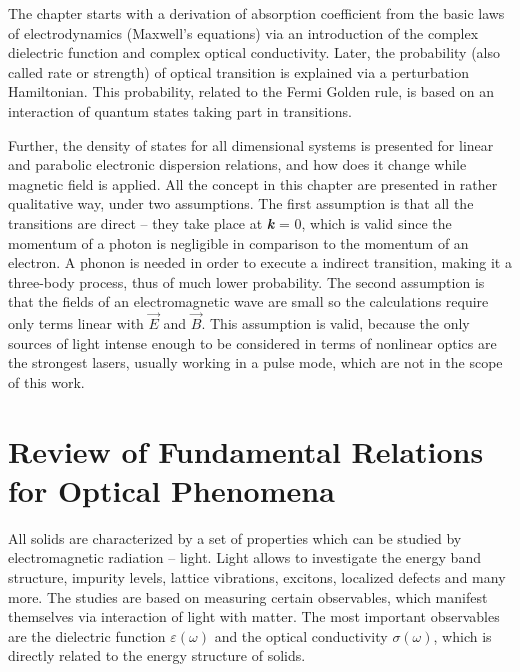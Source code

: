 \documentclass[titlepage,a4paper]{book}
\newcommand{\wciecie}{\quad\phantom{v}}
\begin{document}
The chapter starts with a derivation of absorption coefficient from the basic laws of electrodynamics (Maxwell's equations) via an introduction of the complex dielectric function and complex optical conductivity. Later, the probability (also called rate or strength) of optical transition is explained via a perturbation Hamiltonian. This probability, related to the Fermi Golden rule, is based on an interaction of quantum states taking part in transitions. 

Further, the density of states for all dimensional systems is presented for linear and parabolic electronic dispersion relations, and how does it change while magnetic field is applied. All the concept in this chapter are presented in rather qualitative way, under two assumptions. The first assumption is that all the transitions are direct -- they take place at \textbf{\textit{k}} = 0, which is valid since the momentum of a photon is negligible in comparison to the momentum of an electron. A phonon is needed in order to execute a indirect transition, making it a three-body process, thus of much lower probability. The second assumption is that the fields of an electromagnetic wave are small so the calculations require only terms linear with $\vec{E}$ and $\vec{B}$. This assumption is valid, because the only sources of light intense enough to be considered in terms of nonlinear optics are the strongest lasers, usually working in a pulse mode, which are not in the scope of this work. 
 
\section{Review of Fundamental Relations for Optical Phenomena}
\wciecie
All solids are characterized by a set of properties which can be studied by electromagnetic radiation -- light. Light allows to investigate the energy band structure, impurity levels, lattice vibrations, excitons, localized defects and many more. The studies are based on measuring certain observables, which manifest themselves via interaction of light with matter. The most important observables are the dielectric function $\varepsilon (\omega)$ and the optical conductivity $\sigma (\omega)$, which is directly related to the energy structure of solids. 
\end{document}
